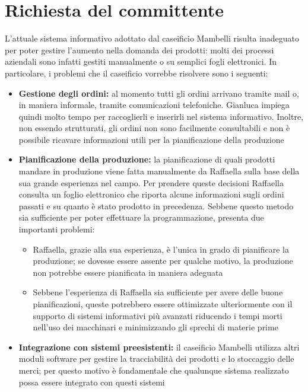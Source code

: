 \section{Richiesta del committente}\label{sec:richiesta-del-committente}
L'attuale sistema informativo adottato dal caseificio Mambelli risulta inadeguato per poter gestire l'aumento nella domanda dei prodotti: molti dei processi aziendali sono infatti gestiti manualmente o su semplici fogli elettronici. In particolare, i problemi che il caseificio vorrebbe risolvere sono i seguenti:
\begin{itemize}
  \item \textbf{Gestione degli ordini:} al momento tutti gli ordini arrivano tramite mail o, in maniera informale, tramite comunicazioni telefoniche. Gianluca impiega quindi molto tempo per raccoglierli e inserirli nel sistema informativo. Inoltre, non essendo strutturati, gli ordini non sono facilmente consultabili e non è possibile ricavare informazioni utili per la pianificazione della produzione
  \item \textbf{Pianificazione della produzione:} la pianificazione di quali prodotti mandare in produzione viene fatta manualmente da Raffaella sulla base della sua grande esperienza nel campo. Per prendere queste decisioni Raffaella consulta un foglio elettronico che riporta alcune informazioni sugli ordini passati e su quanto è stato prodotto in precedenza. Sebbene questo metodo sia sufficiente per poter effettuare la programmazione, presenta due importanti problemi:
  \begin{itemize}
    \item Raffaella, grazie alla sua esperienza, è l'unica in grado di pianificare la produzione; se dovesse essere assente per qualche motivo, la produzione non potrebbe essere pianificata in maniera adeguata
    \item Sebbene l'esperienza di Raffaella sia sufficiente per avere delle buone pianificazioni, queste potrebbero essere ottimizzate ulteriormente con il supporto di sistemi informativi più avanzati riducendo i tempi morti nell'uso dei macchinari e minimizzando gli sprechi di materie prime
  \end{itemize}
  \item \textbf{Integrazione con sistemi preesistenti:} il caseificio Mambelli utilizza altri moduli software per gestire la tracciabilità dei prodotti e lo stoccaggio delle merci; per questo motivo è fondamentale che qualunque sistema realizzato possa essere integrato con questi sistemi
\end{itemize}

